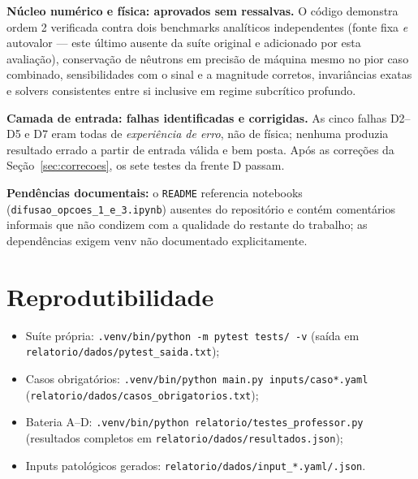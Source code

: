 \documentclass[11pt,a4paper]{article}
\begin{document}
\textbf{Núcleo numérico e física: aprovados sem ressalvas.} O código
demonstra ordem 2 verificada contra dois benchmarks analíticos independentes
(fonte fixa \emph{e} autovalor --- este último ausente da suíte original e
adicionado por esta avaliação), conservação de nêutrons em precisão de máquina
mesmo no pior caso combinado, sensibilidades com o sinal e a magnitude
corretos, invariâncias exatas e solvers consistentes entre si inclusive em
regime subcrítico profundo.

\textbf{Camada de entrada: falhas identificadas e corrigidas.} As cinco falhas
D2--D5 e D7 eram todas de \emph{experiência de erro}, não de física; nenhuma
produzia resultado errado a partir de entrada válida e bem posta. Após as
correções da Seção~\ref{sec:correcoes}, os sete testes da frente D passam.

\textbf{Pendências documentais:} o \texttt{README} referencia notebooks
(\texttt{difusao\_opcoes\_1\_e\_3.ipynb}) ausentes do repositório e contém
comentários informais que não condizem com a qualidade do restante do
trabalho; as dependências exigem venv não documentado explicitamente.

\appendix
\section{Reprodutibilidade}
\begin{itemize}
  \item Suíte própria: \texttt{.venv/bin/python -m pytest tests/ -v}
        (saída em \texttt{relatorio/dados/pytest\_saida.txt});
  \item Casos obrigatórios: \texttt{.venv/bin/python main.py inputs/caso*.yaml}
        (\texttt{relatorio/dados/casos\_obrigatorios.txt});
  \item Bateria A--D: \texttt{.venv/bin/python relatorio/testes\_professor.py}
        (resultados completos em \texttt{relatorio/dados/resultados.json});
  \item Inputs patológicos gerados: \texttt{relatorio/dados/input\_*.yaml/.json}.
\end{itemize}
\end{document}
